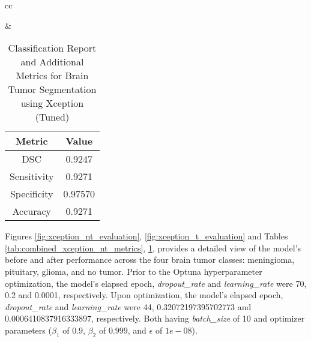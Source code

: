 \begin{table}[ht]
\begin{tabular}{cc}
\begin{minipage}{.6\linewidth}
\begin{subtable}[t]{\linewidth}
                \caption{Classification Report for Brain Tumor Segmentation (Tuned)} 
                \label{tab:xception_t_classification_report}
            \end{subtable}
        \end{minipage} &
        \begin{minipage}{.35\linewidth}
            \centering
            \begin{subtable}[t]{\linewidth}
                \centering
                \begin{tabular}{|c|c|}
                    \hline 
                    \textbf{Metric} & \textbf{Value} \\ 
                    \hline
                    DSC & 0.9247 \\ 
                    \hline
                    Sensitivity & 0.9271 \\ 
                    \hline
                    Specificity & 0.97570 \\ 
                    \hline
                    Accuracy & 0.9271 \\ 
                    \hline
                \end{tabular}
                \caption{Additional Metrics for Brain Tumor Segmentation (Tuned)} 
                \label{tab:xception_t_additional_metrics}
            \end{subtable}
        \end{minipage}
    \end{tabular}
    \caption{Classification Report and Additional Metrics for Brain Tumor Segmentation using Xception (Tuned)}
    \label{tab:combined_xception_t_metrics}
    \end{table}




Figures \ref{fig:xception_nt_evaluation}, \ref{fig:xception_t_evaluation} and Tables \ref{tab:combined_xception_nt_metrics}, \ref{tab:combined_xception_t_metrics}, provides a detailed view of the model's before and after performance across the four brain tumor classes: meningioma, pituitary, glioma, and no tumor. Prior to the Optuna hyperparameter optimization, the model's elapsed epoch, \textit{dropout_rate} and \textit{learning_rate} were 70, 0.2 and 0.0001, respectively. Upon optimization,  the model's elapsed epoch, \textit{dropout_rate} and \textit{learning_rate} were 44, 0.32072197395702773 and 0.0006410837916333897, respectively. Both having \textit{batch_size} of 10 and optimizer parameters ($\beta_1$ of $0.9$, $\beta_2$ of $0.999$, and $\epsilon$ of $1e-08$).

